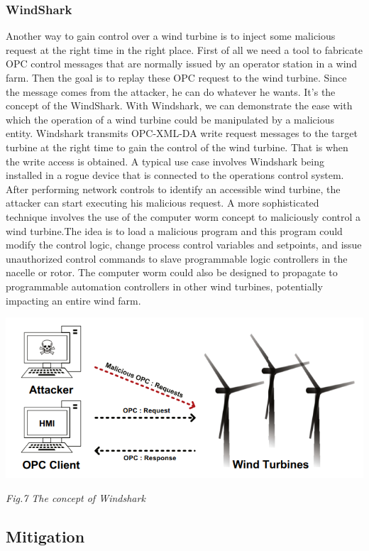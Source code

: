 \documentclass[twosided,a4,10pt]{article}
\begin{document}
\begin{multicols}{2}
\subsubsection{WindShark}
Another way to gain control over a wind turbine is to inject some malicious request at the right time in the right place. First of all we need a tool to fabricate OPC control messages that are normally issued by an operator station in a wind farm. Then the goal is to replay these OPC request to the wind turbine. Since the message comes from the attacker, he can do whatever he wants. It's the concept of the WindShark. With Windshark, we can demonstrate the ease with which the operation of a wind turbine could be manipulated by a malicious entity. Windshark transmits OPC-XML-DA write request messages to the target turbine at the right time to gain the control of the wind turbine. That is when the write access is obtained. \newline
A typical use case involves Windshark being installed in a rogue device that is connected to the operations control system. After performing network controls to identify an accessible wind turbine, the attacker can start executing his malicious request. A more sophisticated technique involves the use of the computer worm concept to maliciously control a wind turbine.The idea is to load a malicious program and this program could modify the control logic, change process control variables and setpoints, and issue unauthorized control commands to slave programmable logic controllers in the nacelle or rotor. The computer worm could also be designed to propagate to programmable automation controllers in other wind turbines, potentially impacting an entire wind farm.


\includegraphics[scale=0.5]{Windshark}
\begin{center}
	\textit{Fig.7 The concept of Windshark}
\end{center}

	
\subsection{Mitigation}


\end{multicols}
\end{document}
